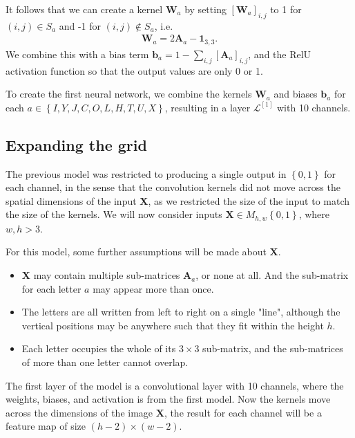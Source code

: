 \documentclass{somasmsc}
\begin{document}
It follows that we can create a kernel $\mathbf{W}_a$ by setting $\left[\mathbf{W}_a\right]_{i,j}$ to 1 for $\left(i,j\right) \in S_a$ and -1 for $\left(i,j\right) \notin S_a$, i.e.
\begin{align*}
\mathbf{W}_a = 2\mathbf{A}_a - \mathbf{1}_{3,3}.
\end{align*}
We combine this with a bias term $\mathbf{b}_a = 1 - \sum_{i,j} \left[\mathbf{A}_a\right]_{i,j}$, and the RelU activation function so that the output values are only 0 or 1.

To create the first neural network, we combine the kernels $\mathbf{W}_a$ and biases $\pmb{b}_a$ for each $a \in \left\{I, Y, J, C, O, L, H, T, U, X\right\}$, resulting in a layer $\mathcal{L}^{\left[1\right]}$ with 10 channels.

\subsection{Expanding the grid}\label{letters:expand}

The previous model was restricted to producing a single output in $\left\{0,1\right\}$ for each channel, in the sense that the convolution kernels did not move across the spatial dimensions of the input $\mathbf{X}$, as we restricted the size of the input to match the size of the kernels. We will now consider inputs $\mathbf{X} \in M_{h,w}\left\{0,1\right\}$, where $w,h > 3$.

For this model, some further assumptions will be made about $\mathbf{X}$.
\begin{itemize}
    \item $\mathbf{X}$ may contain multiple sub-matrices $\mathbf{A}_a$, or none at all. And the sub-matrix for each letter $a$ may appear more than once.
    \item The letters are all written from left to right on a single "line", although the vertical positions may be anywhere such that they fit within the height $h$.
    \item Each letter occupies the whole of its $3 \times 3$ sub-matrix, and the sub-matrices of more than one letter cannot overlap.
\end{itemize}

The first layer of the model is a convolutional layer with 10 channels, where the weights, biases, and activation is from the first model. Now the kernels move across the dimensions of the image $\mathbf{X}$, the result for each channel will be a feature map of size $\left(h - 2\right) \times \left(w - 2\right)$.
\end{document}
